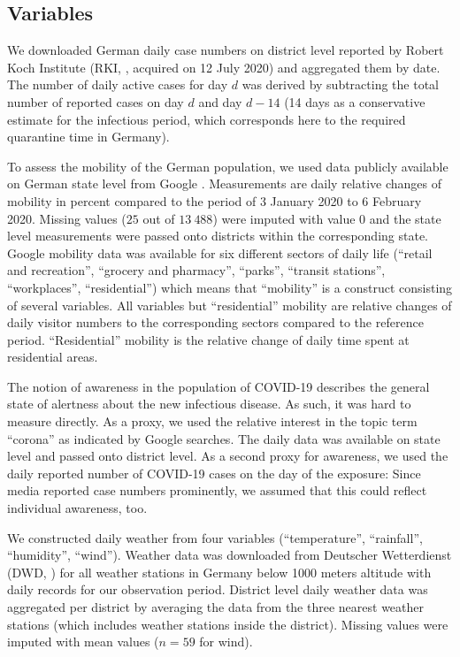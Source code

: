 \documentclass[]{elsarticle} %
\begin{document}
\subsection{Variables}\label{variables}

We downloaded German daily case numbers on district level reported by
Robert Koch Institute (RKI, \citep{casenumbers_rki}, acquired on 12 July
2020) and aggregated them by date. The number of daily active cases for
day \(d\) was derived by subtracting the total number of reported cases
on day \(d\) and day \(d-14\) (14 days as a conservative estimate for
the infectious period, which corresponds here to the required quarantine
time in Germany).

To assess the mobility of the German population, we used data publicly
available on German state level from Google \citep{google_mobility}.
Measurements are daily relative changes of mobility in percent compared
to the period of 3 January 2020 to 6 February 2020. Missing values
(\(25\) out of \(13{\ }488\)) were imputed with value \(0\) and the
state level measurements were passed onto districts within the
corresponding state. Google mobility data was available for six
different sectors of daily life (``retail and recreation'', ``grocery
and pharmacy'', ``parks'', ``transit stations'', ``workplaces'',
``residential'') which means that ``mobility'' is a construct consisting
of several variables. All variables but ``residential'' mobility are
relative changes of daily visitor numbers to the corresponding sectors
compared to the reference period. ``Residential'' mobility is the
relative change of daily time spent at residential areas.

The notion of awareness in the population of COVID-19 describes the
general state of alertness about the new infectious disease. As such, it
was hard to measure directly. As a proxy, we used the relative interest
in the topic term ``corona'' as indicated by Google searches. The daily
data was available on state level \citep{google_trends} and passed onto
district level. As a second proxy for awareness, we used the daily
reported number of COVID-19 cases on the day of the exposure: Since
media reported case numbers prominently, we assumed that this could
reflect individual awareness, too.

We constructed daily weather from four variables (``temperature'',
``rainfall'', ``humidity'', ``wind''). Weather data was downloaded from
Deutscher Wetterdienst (DWD, \citep{dwd_weather}) for all weather
stations in Germany below 1000 meters altitude with daily records for
our observation period. District level daily weather data was aggregated
per district by averaging the data from the three nearest weather
stations (which includes weather stations inside the district). Missing
values were imputed with mean values (\(n=59\) for wind).
\end{document}
